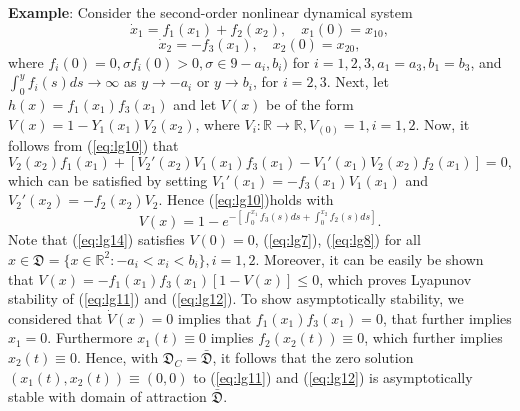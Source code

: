 \documentclass[a4paper]{report}
\theoremstyle{definition}
\begin{document}
\textbf{Example}: Consider the second-order nonlinear dynamical system 
\begin{equation}
\dot{x}_1=f_1(x_1)+f_2(x_2), \quad x_1(0)=x_{10},
\label{eq:lg11}
\end{equation}
\begin{equation}
\dot{x}_2=-f_3(x_1), \quad x_2(0)=x_{20},
\label{eq:lg12}
\end{equation}
where $f_i(0)=0, \sigma f_i(0)>0, \sigma\in9-a_i,b_i)$ for $i=1,2,3, a_1=a_3, b_1=b_3$, and $\int_0^yf_i(s)ds\rightarrow\infty$ as $y\rightarrow-a_i$ or $y\rightarrow b_i$, for $i=2,3$. Next, let $h(x)=f_1(x_1)f_3(x_1)$ and let $V(x)$ be of the form $V(x)=1-Y_1(x_1)V_2(x_2)$, where $V_i:\mathbb{R}\rightarrow\mathbb{R}, V_(0)=1,  i=1,2$. Now, it follows from (\ref{eq:lg10}) that
\begin{equation}
[V_1'(x_1)+f_3(x_1)]V_2(x_2)f_1(x_1)+[V_2'(x_2)V_1(x_1)f_3(x_1)-V_1'(x_1)V_2(x_2)f_2(x_1)]=0,
\label{eq:lg13}
\end{equation}
which can be satisfied by setting $V_1'(x_1)=-f_3(x_1)V_1(x_1)$ and $V_2'(x_2)=-f_2(x_2)V_2$. Hence (\ref{eq:lg10})holds with 
\begin{equation}
V(x)=1-e^{-[\int_0^{x_1} f_3(s)ds+\int_0^{x_2} f_2(s)ds]}.
\label{eq:lg14}
\end{equation}
Note that (\ref{eq:lg14}) satisfies $V(0)=0$, (\ref{eq:lg7}), (\ref{eq:lg8}) for all $x\in \mathfrak{D}=\{x\in\mathbb{R}^2:-a_i<x_i<b_i\},i=1,2$. Moreover, it can be easily be shown that $V(x)=-f_1(x_1)f_3(x_1)[1-V(x)]\le 0$, which proves Lyapunov stability of (\ref{eq:lg11}) and (\ref{eq:lg12}). To show asymptotically stability, we considered that $\dot{V}(x)=0$ implies that $f_1(x_1)f_3(x_1)=0$, that further implies $x_1=0$. Furthermore $x_1(t)\equiv 0$ implies $f_2(x_2(t))\equiv 0$, which further implies $x_2(t)\equiv 0$. Hence, with $\mathfrak{D}_C=\bar{\mathfrak{D}}$, it follows that the zero solution $(x_1(t),x_2(t))\equiv (0,0)$ to (\ref{eq:lg11}) and (\ref{eq:lg12}) is asymptotically stable with domain of attraction $\bar{\mathfrak{D}}$.
\\
\end{document}
